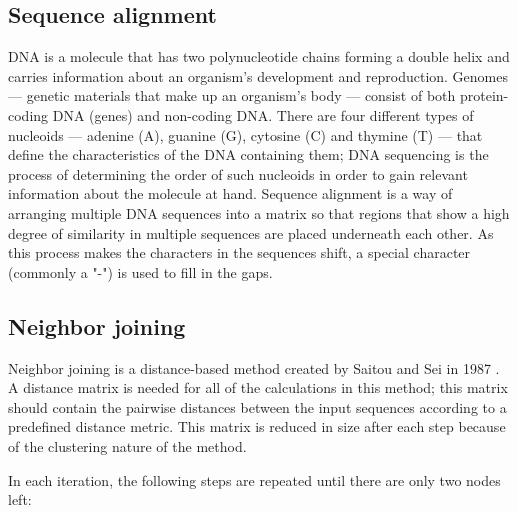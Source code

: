 \documentclass[11pt,twocolumn]{article}
\begin{document}
\subsection{Sequence alignment}

DNA is a molecule that has two polynucleotide chains forming a double helix and carries information about an organism's development and reproduction. Genomes — genetic materials that make up an organism's body — consist of both protein-coding DNA (genes) and non-coding DNA. There are four different types of nucleoids — adenine (A), guanine (G), cytosine (C) and thymine (T) — that define the characteristics of the DNA containing them; DNA sequencing is the process of determining the order of such nucleoids in order to gain relevant information about the molecule at hand. Sequence alignment is a way of arranging multiple DNA sequences into a matrix so that regions that show a high degree of similarity in multiple sequences are placed underneath each other. As this process makes the characters in the sequences shift, a special character (commonly a "-") is used to fill in the gaps.

\subsection{Neighbor joining}

Neighbor joining is a distance-based method created by Saitou and Sei in 1987 \cite{1987}. A distance matrix is needed for all of the calculations in this method; this matrix should contain the pairwise distances between the input sequences according to a predefined distance metric. This matrix is reduced in size after each step because of the clustering nature of the method.

In each iteration, the following steps are repeated until there are only two nodes left:
\end{document}

